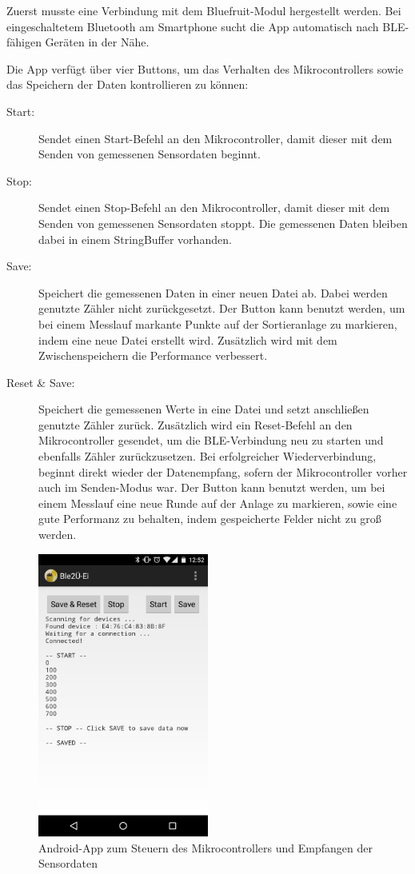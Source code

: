 Zuerst musste eine Verbindung mit dem Bluefruit-Modul hergestellt werden. Bei eingeschaltetem Bluetooth am Smartphone sucht die App automatisch nach BLE-fähigen Geräten in der Nähe. 

Die App verfügt über vier Buttons, um das Verhalten des Mikrocontrollers sowie das Speichern der Daten kontrollieren zu können:
\begin{description}
	\item[Start:] Sendet einen Start-Befehl an den Mikrocontroller, damit dieser mit dem Senden von gemessenen Sensordaten beginnt.
	\item[Stop:] Sendet einen Stop-Befehl an den Mikrocontroller, damit dieser mit dem Senden von gemessenen Sensordaten stoppt. Die gemessenen Daten bleiben dabei in einem StringBuffer vorhanden.
	\item[Save:] Speichert die gemessenen Daten in einer neuen Datei ab. Dabei werden genutzte Zähler nicht zurückgesetzt. Der Button kann benutzt werden, um bei einem Messlauf markante Punkte auf der Sortieranlage zu markieren, indem eine neue Datei erstellt wird. Zusätzlich wird mit dem Zwischenspeichern die Performance verbessert.
	\item[Reset \& Save:] Speichert die gemessenen Werte in eine Datei und setzt anschließen genutzte Zähler zurück. Zusätzlich wird ein Reset-Befehl an den Mikrocontroller gesendet, um die BLE-Verbindung neu zu starten und ebenfalls Zähler zurückzusetzen. Bei erfolgreicher Wiederverbindung, beginnt direkt wieder der Datenempfang, sofern der Mikrocontroller vorher auch im Senden-Modus war. Der Button kann benutzt werden, um bei einem Messlauf eine neue Runde auf der Anlage zu markieren, sowie eine gute Performanz zu behalten, indem gespeicherte Felder nicht zu groß werden.
\end{description}

\begin{figure}[h]
	\centering
	\includegraphics[width=0.5\textwidth]{images/k3-androidapp.png}
	\caption {Android-App zum Steuern des Mikrocontrollers und Empfangen der Sensordaten}
	\label{fig:k3_androidapp}
\end{figure}

